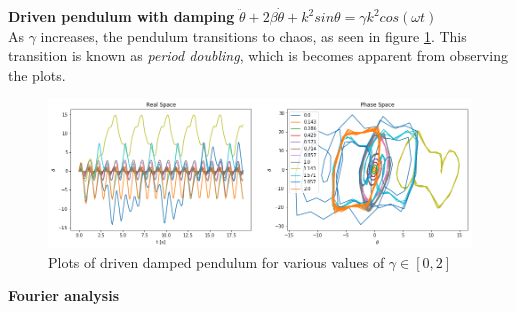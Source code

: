 \begin{problem}{6}
	\textbf{Driven pendulum with damping} $\ddot{\theta}+2\beta\dot{\theta}+k^{2}sin\theta=\gamma k^{2}cos(\omega t)$ \\

As $\gamma$ increases, the pendulum transitions to chaos, as seen in figure \ref{damped}.  This transition is known as \textit{period doubling}, which is becomes apparent from observing the plots.  

\begin{figure}[h!]
	\centering
  	\includegraphics[scale=0.5]{../figures/dampedDriven.png}
 	\caption{Plots of driven damped pendulum for various values of $\gamma \in [0,2]$}
  	\label{damped}
\end{figure}

\end{problem}

\begin{problem}{7}
	\textbf{Fourier analysis}
\end{problem}
